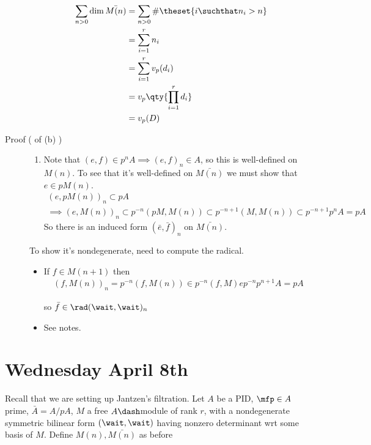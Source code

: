 \begin{description}
\begin{center}
  \begin{align*}
  \sum_{n > 0} \dim \bar{M(n)}
  &= \sum_{n > 0} \# \theset{i \suchthat n_i > n} \\
  &= \sum_{i=1}^r n_i \\
  &= \sum_{i=1}^r v_p (d_i) \\
  &= v_p \qty{ \prod_{i=1}^r d_i } \\
  &= v_p(D)
  \end{align*}
  \end{center}
\item[Proof ( of (b) )]
\hfill

\begin{enumerate}
\def\labelenumi{\arabic{enumi}.}
\tightlist
\item
  Note that \((e, f) \in p^n A \implies (e, f)_n \in A\), so this is
  well-defined on \(M(n)\). To see that it's well-defined on
  \(\bar{M(n)}\) we must show that \(e \in p M(n)\).
  \begin{align*}
    (e, pM(n))_n \subset pA \\
    \implies (e, M(n))_n \subset p^{-n}(pM, M(n)) \subset p^{-n+1}(M, M(n)) \subset p^{-n+1}p^n A = pA
    \end{align*} So there is an induced form \((\bar e, \bar f)_n\) on
  \(\bar{M(n)}\).
\end{enumerate}

To show it's nondegenerate, need to compute the radical.

\begin{itemize}
\item
  If \(f\in M(n+1)\) then
  \begin{align*}
  (f, M(n))_{n}=p^{-n}(f, M(n)) \in p^{-n}(f, M) e p^{-n} p^{n+1} A=p A
  \end{align*}

  so \(\bar f \in \rad (\wait, \wait)_n\)
\item
  See notes.
\end{itemize}
\end{description}

\hypertarget{wednesday-april-8th}{%
\section{Wednesday April 8th}\label{wednesday-april-8th}}

Recall that we are setting up Jantzen's filtration. Let \(A\) be a PID,
\(\mfp \in A\) prime, \(\bar A = A/pA\), \(M\) a free \(A\dash\)module
of rank \(r\), with a nondegenerate symmetric bilinear form
\((\wait ,\wait)\) having nonzero determinant wrt some basis of \(M\).
Define \(M(n), \bar{M(n)}\) as before

